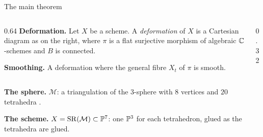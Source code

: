 \begin{frame}{The main theorem}
\begin{columns}[c]
\begin{column}{0.64\textwidth}
\textbf{Deformation.} Let \(X\) be a scheme. A \emph{deformation} of \(X\) is a Cartesian diagram as on the right, where \(\pi\) is a flat surjective morphism of algebraic \(\mathbb C\)-schemes and \(B\) is connected.
\par\medskip
\textbf{Smoothing.} A deformation where the general fibre \(X_t\) of \(\pi\) is smooth.
\end{column}
\begin{column}{0.32\textwidth}\centering
{}
\end{column}
\end{columns}
\par\medskip
\textbf{The sphere.} \(\mathcal M\): a triangulation of the \(3\)-sphere with \(8\) vertices and \(20\) tetrahedra \cite{GS}.
\par\medskip
\textbf{The scheme.} \(X=\operatorname{SR}(\mathcal M)\subset\mathbb P^7\): one \(\mathbb P^3\) for each tetrahedron, glued as the tetrahedra are glued.
\par\medskip
{}
\end{frame}


